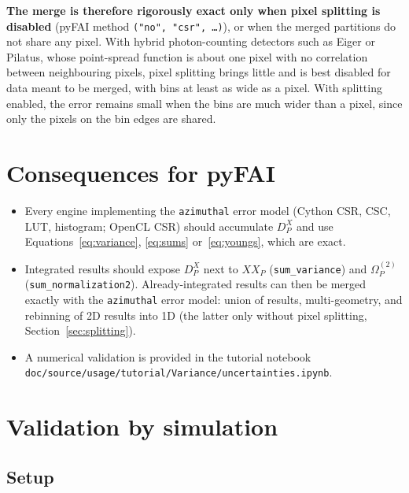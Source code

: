 \documentclass[a4paper,11pt]{article}
\newcommand{\OmS}{\Omega^{(2)}}
\newcommand{\D}[2]{D^{#1}_{#2}}
\begin{document}
\textbf{The merge is therefore rigorously exact only when pixel splitting is disabled} (pyFAI method
\texttt{("no", "csr", \dots)}), or when the merged partitions do not share any pixel. With hybrid
photon-counting detectors such as Eiger or Pilatus, whose point-spread function is about one pixel
with no correlation between neighbouring pixels, pixel splitting brings little and is best disabled for
data meant to be merged, with bins at least as wide as a pixel. With splitting enabled, the error remains
small when the bins are much wider than a pixel, since only the pixels on the bin edges are shared.

\section{Consequences for pyFAI}
\sloppy

\begin{itemize}
\item Every engine implementing the \texttt{azimuthal} error model (Cython CSR, CSC, LUT, histogram;
  OpenCL CSR) should accumulate $\D{X}{P}$ and use Equations~\eqref{eq:variance}, \eqref{eq:sums}
  or~\eqref{eq:youngs}, which are exact.
\item Integrated results should expose $\D{X}{P}$ next to $XX_P$ (\texttt{sum\_variance}) and $\OmS_P$
  (\texttt{sum\_normalization2}). Already-integrated results can then be merged exactly with the
  \texttt{azimuthal} error model: union of results, multi-geometry, and rebinning of 2D results into 1D
  (the latter only without pixel splitting, Section~\ref{sec:splitting}).
\item A numerical validation is provided in the tutorial notebook
  \nolinkurl{doc/source/usage/tutorial/Variance/uncertainties.ipynb}.
\end{itemize}

\section{Validation by simulation}
\label{sec:simulation}

\subsection{Setup}
\end{document}
